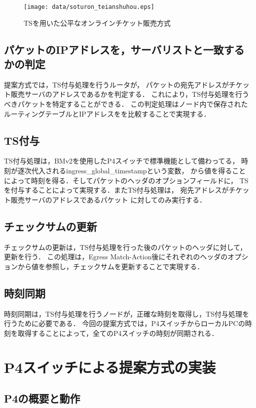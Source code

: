 \documentclass[a4j,11pt]{jreport}
\begin{document}
\begin{figure}[htbp]
  \centering
  \texttt{[image: data/soturon\_teianshuhou.eps]}
  \vspace{0mm}
  \caption{TSを用いた公平なオンラインチケット販売方式}
  \label{fig:teianshuhou}
\end{figure}

\section{パケットのIPアドレスを，サーバリストと一致するかの判定}
提案方式では，TS付与処理を行うルータが，
パケットの宛先アドレスがチケット販売サーバのアドレスであるかを判定する．
これにより，TS付与処理を行うべきパケットを特定することができる．
この判定処理はノード内で保存されたルーティングテーブルとIPアドレスをを比較することで実現する．

\section{TS付与}
TS付与処理は，BMv2を使用したP4スイッチで標準機能として備わってる，
時刻が逐次代入されるingress\_global\_timestampという変数，
から値を得ることによって時刻を得る．そしてパケットのヘッダのオプションフィールドに，
TSを付与することによって実現する．またTS付与処理は，
宛先アドレスがチケット販売サーバのアドレスであるパケット
に対してのみ実行する．

\section{チェックサムの更新}
チェックサムの更新は，TS付与処理を行った後のパケットのヘッダに対して，更新を行う．
この処理は，Egress Match-Action後にそれぞれのヘッダのオプションから値を参照し，チェックサムを更新することで実現する．


\section{時刻同期}
時刻同期は，TS付与処理を行うノードが，正確な時刻を取得し，TS付与処理を行うために必要である．
今回の提案方式では，P4スイッチからローカルPCの時刻を取得することによって，全てのP4スイッチの時刻が同期される．


\chapter{P4スイッチによる提案方式の実装}

\section{P4の概要と動作}
\end{document}
